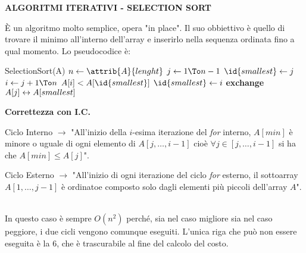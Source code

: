\documentclass[8pt]{extarticle}
\begin{document}
\begin{formulario}
		\begin{tcenter}
\textbf{ALGORITMI ITERATIVI - SELECTION SORT}
		\end{tcenter}
È un algoritmo molto semplice, opera "in place". Il suo obbiettivo è quello di trovare il minimo all'interno dell'array e inserirlo nella sequenza ordinata fino a qual momento. Lo pseudocodice è: \\		
		\begin{code}{SelectionSort(A)}
\li $n\la\attrib{A}{lenght}$
\li \For $j\la1 \To n-1$ \Do
	\li $\id{smallest}\la j$
	\li \For $i \la j+1 \To n$ \Do
		\li \If $A[i]<A[\id{smallest}]$ \Then
			\li $\id{smallest}\la i$
		\End
	\End
	\li \bf{exchange }$A[j]\leftrightarrow A[smallest]$
		\end{code}				
\textbf{Correttezza con I.C.}
		\begin{descr}{1}
\item[Ciclo Interno] $\rightarrow$ "All'inizio della $i$-esima iterazione del \textit{for} interno, $A[min]$ è minore o uguale di ogni elemento di $A[j,\dots,i-1]$ cioè $\forall j\in [j,\dots,i-1]$ si ha che $A[min]\leq A[j]$". 
\item[Ciclo Esterno] $\rightarrow$ "All'inizio di ogni iterazione del ciclo \textit{for} esterno, il sottoarray $A[1,\dots,j-1]$ è ordinatoe composto solo dagli elementi più piccoli dell'array $A$".
		\end{descr}
\\
In questo caso è sempre $O(n^2)$ perché, sia nel caso migliore sia nel caso peggiore, i due cicli  vengono comunque eseguiti. L'unica riga che può non essere eseguita è la 6, che è trascurabile al fine del calcolo del costo.\\
\myRule


\end{formulario}
\end{document}
